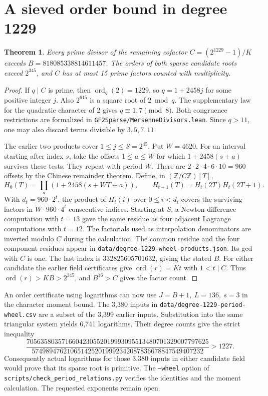 \documentclass[11pt]{article}
\newtheorem{theorem}{Theorem}
\newcommand{\ord}{\operatorname{ord}}
\begin{document}
\section{A sieved order bound in degree 1229}
\begin{theorem}\label{thm:1229-cofactor-bound}
Every prime divisor of the remaining cofactor \(C=(2^{1229}-1)/K\)
exceeds \(B=818085338814611457\). The orders of both sparse candidate
roots exceed \(2^{345}\), and \(C\) has at most 15 prime factors
counted with multiplicity.
\end{theorem}
\begin{proof}
If \(q\mid C\) is prime, then \(\ord_q(2)=1229\), so \(q=1+2458j\)
for some positive integer \(j\). Also \(2^{615}\) is a square root
of \(2\bmod q\). The supplementary law for the quadratic character of
2 gives \(q\equiv1,7\pmod8\). Both congruence restrictions are
formalized in \nolinkurl{GF2Sparse/MersenneDivisors.lean}.
Since \(q>11\), one may also discard terms divisible by \(3,5,7,11\).

The earlier two products cover \(1\le j\le S=2^{45}\).
Put \(W=4620\). For an interval starting after index \(s\), take the
offsets \(1\le a\le W\) for which \(1+2458(s+a)\) survives these
tests. They repeat with period \(W\). There are
\(2\cdot2\cdot4\cdot6\cdot10=960\) offsets by the Chinese remainder
theorem. Define, in \((\mathbb Z/C\mathbb Z)[T]\),
\[
 H_0(T)=\prod_a(1+2458(s+WT+a)),\qquad
 H_{t+1}(T)=H_t(2T)H_t(2T+1).
\]
With \(d_t=960\cdot2^t\), the product of \(H_t(i)\) over
\(0\le i<d_t\) covers the surviving factors in \(W\cdot960\cdot4^t\)
consecutive indices. Starting at \(S\), a Newton-difference computation
with \(t=13\) gave the same residue as four adjacent Lagrange
computations with \(t=12\). The factorials used as interpolation
denominators are inverted modulo \(C\) during the calculation.
The common residue and the four component residues appear in
\nolinkurl{data/degree-1229-wheel-products.json}. Its gcd with \(C\)
is one. The last index is \(332825605701632\), giving the stated \(B\).
For either candidate the earlier field certificates give \(\ord(r)=Kt\)
with \(1<t\mid C\). Thus \(\ord(r)>KB>2^{345}\), and \(B^{16}>C\)
gives the factor count.
\end{proof}

An order certificate using logarithms can now use
\(J=B+1,\ L=136,\ s=3\) in the character moment bound.
The 3,380 inputs in \nolinkurl{data/degree-1229-period-wheel.csv}
are a subset of the 3,399 earlier inputs. Substitution into the same
triangular system yields 6,741 logarithms. Their degree counts give
the strict inequality
\[
 \frac{7056358035716604230552019993095513480701329007797625}
      {5749894762106514252019992342087836678847549407232}>1227.
\]
Consequently actual logarithms for those 3,380 inputs in either
candidate field would prove that its sparse root is primitive.
The \texttt{--wheel} option of
\nolinkurl{scripts/check_period_relations.py} verifies the identities
and the moment calculation. The requested exponents remain open.
\end{document}
